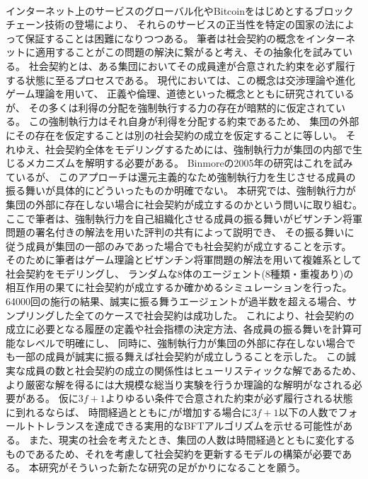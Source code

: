 ~ \\
  インターネット上のサービスのグローバル化やBitcoin\cite{nakamoto2008bitcoin}をはじめとするブロックチェーン技術の登場により、
  それらのサービスの正当性を特定の国家の法によって保証することは困難になりつつある。
  筆者は社会契約の概念をインターネットに適用することがこの問題の解決に繋がると考え、その抽象化を試みている。
  社会契約とは、ある集団においてその成員達が合意された約束を必ず履行する状態に至るプロセスである。
  現代においては、この概念は交渉理論や進化ゲーム理論を用いて、
  正義や倫理、道徳といった概念とともに研究されている\cite{sep-game-ethics}が、
  その多くは利得の分配を強制執行する力の存在が暗黙的に仮定されている。
  この強制執行力はそれ自身が利得を分配する約束であるため、
  集団の外部にその存在を仮定することは別の社会契約の成立を仮定することに等しい。
  それゆえ、社会契約全体をモデリングするためには、強制執行力が集団の内部で生じるメカニズムを解明する必要がある。
  Binmoreの2005年の研究\cite{binmore2005}はこれを試みているが、
  このアプローチは還元主義的なため強制執行力を生じさせる成員の振る舞いが具体的にどういったものか明確でない。
  本研究では、強制執行力が集団の外部に存在しない場合に社会契約が成立するのかという問いに取り組む。
  ここで筆者は、強制執行力を自己組織化させる成員の振る舞いがビザンチン将軍問題の署名付きの解法\cite{lamport1982}を用いた評判の共有によって説明でき、
  その振る舞いに従う成員が集団の一部のみであった場合でも社会契約が成立することを示す。
  そのために筆者はゲーム理論とビザンチン将軍問題の解法を用いて複雑系として社会契約をモデリングし、
  ランダムな8体のエージェント(8種類・重複あり)の相互作用の果てに社会契約が成立するか確かめるシミュレーションを行った。
  64000回の施行の結果、誠実に振る舞うエージェントが過半数を超える場合、サンプリングした全てのケースで社会契約は成功した。
  これにより、社会契約の成立に必要となる履歴の定義や社会指標の決定方法、各成員の振る舞いを計算可能なレベルで明確にし、
  同時に、強制執行力が集団の外部に存在しない場合でも一部の成員が誠実に振る舞えば社会契約が成立しうることを示した。
  この誠実な成員の数と社会契約の成立の関係性はヒューリスティックな解であるため、
  より厳密な解を得るには大規模な総当り実験を行うか理論的な解明がなされる必要がある。
  仮に$3f+1$よりゆるい条件で合意された約束が必ず履行される状態に到れるならば、
  時間経過とともに$f$が増加する場合に$3f+1$以下の人数でフォールトトレランスを達成できる実用的なBFTアルゴリズムを示せる可能性がある。
  また、現実の社会を考えたとき、集団の人数は時間経過とともに変化するものであるため、それを考慮して社会契約を更新するモデルの構築が必要である。
  本研究がそういった新たな研究の足がかりになることを願う。
~ \\